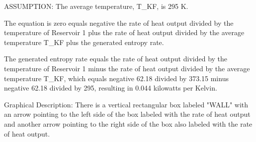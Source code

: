 ASSUMPTION: The average temperature, T_KF, is 295 K.

The equation is zero equals negative the rate of heat output divided by the temperature of Reservoir 1 plus the rate of heat output divided by the average temperature T_KF plus the generated entropy rate.

The generated entropy rate equals the rate of heat output divided by the temperature of Reservoir 1 minus the rate of heat output divided by the average temperature T_KF, which equals negative 62.18 divided by 373.15 minus negative 62.18 divided by 295, resulting in 0.044 kilowatts per Kelvin.

Graphical Description:
There is a vertical rectangular box labeled "WALL" with an arrow pointing to the left side of the box labeled with the rate of heat output and another arrow pointing to the right side of the box also labeled with the rate of heat output.